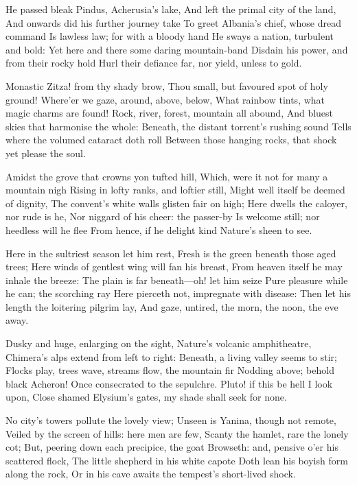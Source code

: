 \documentclass[10pt,twocolumn]{book}
\begin{document}
   He passed bleak Pindus, Acherusia's lake,
   And left the primal city of the land,
   And onwards did his further journey take
   To greet Albania's chief, whose dread command
   Is lawless law; for with a bloody hand
   He sways a nation, turbulent and bold:
   Yet here and there some daring mountain-band
   Disdain his power, and from their rocky hold
Hurl their defiance far, nor yield, unless to gold.


   Monastic Zitza! from thy shady brow,
   Thou small, but favoured spot of holy ground!
   Where'er we gaze, around, above, below,
   What rainbow tints, what magic charms are found!
   Rock, river, forest, mountain all abound,
   And bluest skies that harmonise the whole:
   Beneath, the distant torrent's rushing sound
   Tells where the volumed cataract doth roll
Between those hanging rocks, that shock yet please the soul.

   Amidst the grove that crowns yon tufted hill,
   Which, were it not for many a mountain nigh
   Rising in lofty ranks, and loftier still,
   Might well itself be deemed of dignity,
   The convent's white walls glisten fair on high;
   Here dwells the caloyer, nor rude is he,
   Nor niggard of his cheer:  the passer-by
   Is welcome still; nor heedless will he flee
From hence, if he delight kind Nature's sheen to see.


   Here in the sultriest season let him rest,
   Fresh is the green beneath those aged trees;
   Here winds of gentlest wing will fan his breast,
   From heaven itself he may inhale the breeze:
   The plain is far beneath---oh! let him seize
   Pure pleasure while he can; the scorching ray
   Here pierceth not, impregnate with disease:
   Then let his length the loitering pilgrim lay,
And gaze, untired, the morn, the noon, the eve away.


   Dusky and huge, enlarging on the sight,
   Nature's volcanic amphitheatre,
   Chimera's alps extend from left to right:
   Beneath, a living valley seems to stir;
   Flocks play, trees wave, streams flow, the mountain fir
   Nodding above; behold black Acheron!
   Once consecrated to the sepulchre.
   Pluto! if this be hell I look upon,
Close shamed Elysium's gates, my shade shall seek for none.


   No city's towers pollute the lovely view;
   Unseen is Yanina, though not remote,
   Veiled by the screen of hills:  here men are few,
   Scanty the hamlet, rare the lonely cot;
   But, peering down each precipice, the goat
   Browseth:  and, pensive o'er his scattered flock,
   The little shepherd in his white capote
   Doth lean his boyish form along the rock,
Or in his cave awaits the tempest's short-lived shock.
\end{document}
